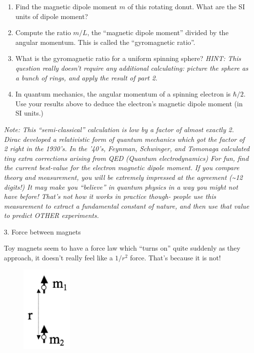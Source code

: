 \documentclass[11pt]{article}
\def\tightlist{}
\begin{document}
\begin{enumerate}
\def\labelenumi{\arabic{enumi}.}
\tightlist
\item
  Find the magnetic dipole moment \(m\) of this rotating donut. What are
  the SI units of dipole moment?
\item
  Compute the ratio \(m/L\), the ``magnetic dipole moment'' divided by
  the angular momentum. This is called the ``gyromagnetic ratio''.
\item
  What is the gyromagnetic ratio for a uniform spinning sphere?
  \emph{HINT: This question really doesn't require any additional
  calculating: picture the sphere as a bunch of rings, and apply the
  result of part 2.}
\item
  In quantum mechanics, the angular momentum of a spinning electron is
  \(\hbar/2\). Use your results above to deduce the electron's magnetic
  dipole moment (in SI units.)
\end{enumerate}

\emph{Note: This ``semi-classical'' calculation is low by a factor of
almost exactly 2. Dirac developed a relativistic form of quantum
mechanics which got the factor of 2 right in the 1930's. In the '40's,
Feynman, Schwinger, and Tomonaga calculated tiny extra corrections
arising from QED (Quantum electrodynamics) For fun, find the current
best-value for the electron magnetic dipole moment. If you compare
theory and measurement, you will be extremely impressed at the agreement
(\textasciitilde{}12 digits!) It may make you ``believe'' in quantum
physics in a way you might not have before! That's not how it works in
practice though- people use this measurement to extract a fundamental
constant of nature, and then use that value to predict OTHER
experiments.}

{\Large 3. Force between magnets}\label{force-between-magnets}

Toy magnets seem to have a force law which ``turns on'' quite suddenly
as they approach, it doesn't really feel like a \(1/r^2\) force. That's
because it is not!

\begin{figure}[htbp]
\centering
\includegraphics[width=1in]{./images/hw11/two_mag_dipoles.png}
\end{figure}
\end{document}
